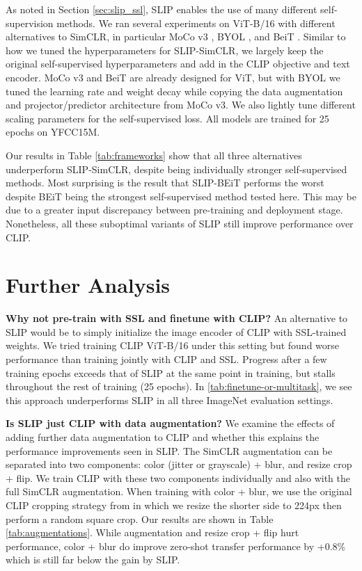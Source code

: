 \documentclass[10pt,twocolumn,letterpaper]{article}
\renewcommand{\paragraph}[1]{\vspace{1.25mm}\noindent\textbf{#1}}
\begin{document}
As noted in Section \ref{sec:slip_ssl}, SLIP enables the use of many different self-supervision methods.
We ran several experiments on ViT-B/16 with different alternatives to SimCLR, in particular MoCo v3 \cite{Chen2021AnES}, BYOL \cite{Grill2020BootstrapYO}, and BeiT \cite{Bao2021BEiTBP}.
Similar to how we tuned the hyperparameters for SLIP-SimCLR, we largely keep the original self-supervised hyperparameters and add in the CLIP objective and text encoder.
MoCo v3 and BeiT are already designed for ViT, but with BYOL we tuned the learning rate and weight decay while copying the data augmentation and projector/predictor architecture from MoCo v3.
We also lightly tune different scaling parameters for the self-supervised loss.
All models are trained for 25 epochs on YFCC15M.

Our results in Table \ref{tab:frameworks} show that all three alternatives underperform SLIP-SimCLR, despite being individually stronger self-supervised methods.
Most surprising is the result that SLIP-BEiT performs the worst despite BEiT being the strongest self-supervised method tested here.
This may be due to a greater input discrepancy between pre-training and deployment stage. Nonetheless, all these suboptimal variants of SLIP still improve performance over CLIP.

\section{Further Analysis}
\label{sec:analysis}
\paragraph{Why not pre-train with SSL and finetune with CLIP?}
An alternative to SLIP would be to simply initialize the image encoder of CLIP with SSL-trained weights.
We tried training CLIP ViT-B/16 under this setting but found worse performance than training jointly with CLIP and SSL.
Progress after a few training epochs exceeds that of SLIP at the same point in training, but stalls throughout the rest of training (25 epochs).
In \ref{tab:finetune-or-multitask}, we see this approach underperforms SLIP in all three ImageNet evaluation settings.

\paragraph{Is SLIP just CLIP with data augmentation?}
We examine the effects of adding further data augmentation to CLIP and whether this explains the performance improvements seen in SLIP.
The SimCLR augmentation can be separated into two components: color (jitter or grayscale) + blur, and resize crop + flip.
We train CLIP with these two components individually and also with the full SimCLR augmentation.
When training with color + blur, we use the original CLIP cropping strategy from \cite{Radford2021LearningTV} in which we resize the shorter side to 224px then perform a random square crop.
Our results are shown in Table \ref{tab:augmentations}.
While augmentation and resize crop + flip hurt performance, color + blur do improve zero-shot transfer performance by +0.8\% which is still far below the gain by SLIP.
\end{document}
